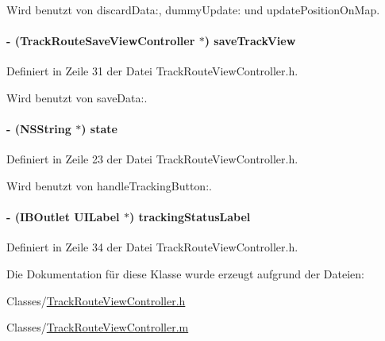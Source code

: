 Wird benutzt von discardData:, dummyUpdate: und updatePositionOnMap.\hypertarget{interface_track_route_view_controller_a155bf96abb68b5883fdca56f840fc6fa}{
\paragraph[{saveTrackView}]{\setlength{\rightskip}{0pt plus 5cm}-\/ ({\bf TrackRouteSaveViewController} $\ast$) saveTrackView}\hfill}
\label{interface_track_route_view_controller_a155bf96abb68b5883fdca56f840fc6fa}


Definiert in Zeile 31 der Datei TrackRouteViewController.h.

Wird benutzt von saveData:.\hypertarget{interface_track_route_view_controller_ae1dba17062d54b302adb5926250a3823}{
\paragraph[{state}]{\setlength{\rightskip}{0pt plus 5cm}-\/ (NSString $\ast$) state}\hfill}
\label{interface_track_route_view_controller_ae1dba17062d54b302adb5926250a3823}


Definiert in Zeile 23 der Datei TrackRouteViewController.h.

Wird benutzt von handleTrackingButton:.\hypertarget{interface_track_route_view_controller_a91899ed881e6b01cd319463c0d03b504}{
\paragraph[{trackingStatusLabel}]{\setlength{\rightskip}{0pt plus 5cm}-\/ (IBOutlet UILabel $\ast$) trackingStatusLabel}\hfill}
\label{interface_track_route_view_controller_a91899ed881e6b01cd319463c0d03b504}


Definiert in Zeile 34 der Datei TrackRouteViewController.h.

Die Dokumentation für diese Klasse wurde erzeugt aufgrund der Dateien:\begin{DoxyCompactItemize}
\item 
Classes/\hyperlink{_track_route_view_controller_8h}{TrackRouteViewController.h}\item 
Classes/\hyperlink{_track_route_view_controller_8m}{TrackRouteViewController.m}\end{DoxyCompactItemize}
